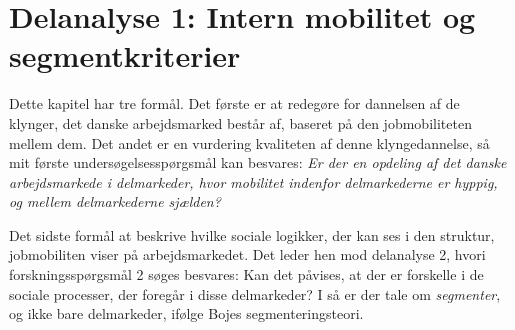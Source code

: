 


\chapter{Delanalyse 1: Intern mobilitet og segmentkriterier\label{kap_delanalyse1_deskriptivt}}

Dette kapitel har tre formål. Det første er at redegøre for dannelsen af de klynger, det danske arbejdsmarked består af, baseret på den jobmobiliteten mellem dem. Det andet er en vurdering kvaliteten af denne klyngedannelse, så mit første undersøgelsesspørgsmål kan besvares: \emph{Er der en opdeling af det danske arbejdsmarkede i delmarkeder, hvor mobilitet indenfor delmarkederne er hyppig, og mellem delmarkederne sjælden?}

Det sidste formål at beskrive hvilke sociale logikker, der kan ses i den struktur, jobmobiliten viser på arbejdsmarkedet. Det leder hen mod delanalyse 2, hvori forskningsspørgsmål 2 søges besvares: Kan det påvises, at der er forskelle i de sociale processer, der foregår i disse delmarkeder? I så er der tale om \emph{segmenter}, og ikke bare delmarkeder, ifølge Bojes segmenteringsteori.  %

	




% 
% 
% 
% 
% 





